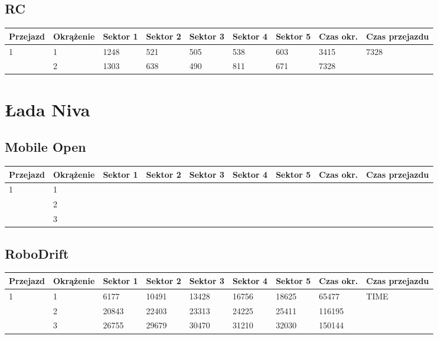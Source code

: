 \documentclass[11pt]{article}
\begin{document}
\subsection{RC}
\begin{table}[h]
\begin{tabular}{|l|l|l|l|l|l|l|l|l|}
\hline
 Przejazd        & Okrążenie & Sektor 1 & Sektor 2 & Sektor 3 & Sektor 4 & Sektor 5 & Czas okr. & Czas przejazdu    \\ \hline
\multirow{2}{*}{1}& 1 &1248& 521& 505& 538& 603& 3415& \multirow{2}{*}{7328} \\ \cline{2-8}
& 2& 1303& 638& 490& 811& 671& 7328& \\ \hline
\end{tabular}
\end{table}
\pagebreak
\section{Łada Niva}
\subsection{Mobile Open}
\begin{table}[h]
\begin{tabular}{|l|l|l|l|l|l|l|l|l|}
\hline
   Przejazd        & Okrążenie & Sektor 1 & Sektor 2 & Sektor 3 & Sektor 4 & Sektor 5 & Czas okr. & Czas przejazdu    \\ \hline
\multirow{3}{*}{1} & 1         &          &          &          &          &          &           & \multirow{3}{*}{} \\ \cline{2-8}
                         & 2         &          &          &          &          &          &           &                    \\ \cline{2-8}
                         & 3         &          &          &          &          &          &           &                    \\ \hline
\end{tabular}
\end{table}
\subsection{RoboDrift}
\begin{table}[h]
\begin{tabular}{|l|l|l|l|l|l|l|l|l|}
\hline
   Przejazd        & Okrążenie & Sektor 1 & Sektor 2 & Sektor 3 & Sektor 4 & Sektor 5 & Czas okr. & Czas przejazdu    \\ \hline
\multirow{3}{*}{1}& 1 &6177& 10491& 13428& 16756& 18625& 65477& \multirow{3}{*}{TIME} \\ \cline{2-8}
& 2& 20843& 22403& 23313& 24225& 25411& 116195& \\ \cline{2-8}
& 3& 26755& 29679& 30470& 31210& 32030& 150144& \\ \hline
\end{tabular}
\end{table}
\end{document}
